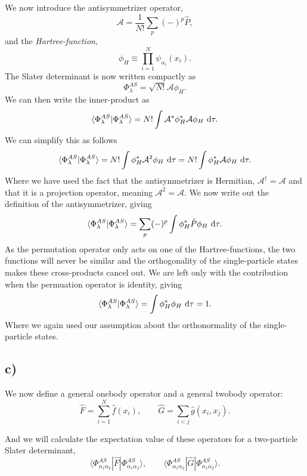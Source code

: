 \documentclass[a4paper, 11pt, notitlepage, english]{article}
\newcommand{\braket}[2]{\langle #1 | #2 \rangle}
\newcommand{\op}[1]{\hat{#1}}
\newcommand{\braopket}[3]{\langle #1 | {#2} | #3 \rangle}
\renewcommand{\d}{{\rm d}}
\begin{document}
We now introduce the antisymmetrizer operator,
$$\mathcal{A} = \frac{1}{N!}\sum_p (-)^p \op{P},$$
and the \emph{Hartree-function},
$$\phi_H \equiv \prod_{i=1}^N \psi_{\alpha_i}(x_i).$$
The Slater determinant is now written compactly as
$$\Phi_\lambda^{AS} = \sqrt{N!}\mathcal{A}\phi_H.$$
We can then write the inner-product as
$$\braket{\Phi_\lambda^{AS}}{\Phi_\lambda^{AS}} = N! \int \mathcal{A}^* \phi^*_H \mathcal{A} \phi_H \ \d \tau .$$
We can simplify this as follows
$$\braket{\Phi_\lambda^{AS}}{\Phi_\lambda^{AS}} = N! \int \phi^*_H \mathcal{A}^2 \phi_H \ \d \tau = N! \int \phi^*_H \mathcal{A} \phi_H \ \d \tau.$$
Where we have used the fact that the antisymmetrizer is Hermitian, $\mathcal{A}^\dagger = \mathcal{A}$ and that it is a projection operator, meaning $\mathcal{A}^2 = \mathcal{A}$.
We now write out the definition of the antisymmetrizer, giving
$$\braket{\Phi_\lambda^{AS}}{\Phi_\lambda^{AS}} = \sum_p (-)^p \int \phi^*_H \\\op{P} \phi_H \ \d \tau.$$
As the permutation operator only acts on one of the Hartree-functions, the two functions will never be similar and the orthogonality of the single-particle states makes these cross-products cancel out. We are left only with the contribution when the permuation operator is identity, giving
$$\braket{\Phi_\lambda^{AS}}{\Phi_\lambda^{AS}} = \int \phi^*_H \phi_H \ \d \tau = 1.$$
Where we again used our assumption about the orthonormality of the single-particle states.


\subsection*{c)}
We now define a general onebody operator and a general twobody operator:
$$\op{F} = \sum_{i=1}^N \op{f}(x_i), \qquad \op{G} = \sum_{i<j} \op{g}(x_i, x_j).$$

And we will  calculate the expectation value of these operators for a two-particle Slater determinant, 
$$\braopket{\Phi^{AS}_{\alpha_1\alpha_2}}{\op{F}}{\Phi^{AS}_{\alpha_1\alpha_2}}, \qquad \braopket{\Phi^{AS}_{\alpha_1\alpha_2}}{\op{G}}{\Phi^{AS}_{\alpha_1\alpha_2}}.$$
\end{document}
